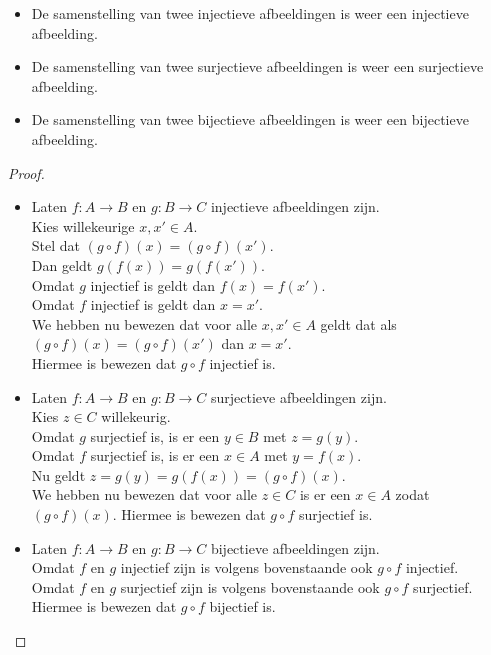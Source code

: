 \begin{theorem}\mbox{}
\begin{itemize}
    \item De samenstelling van twee injectieve afbeeldingen is weer een injectieve afbeelding.
    \item De samenstelling van twee surjectieve afbeeldingen is weer een surjectieve afbeelding.
    \item De samenstelling van twee bijectieve afbeeldingen is weer een bijectieve afbeelding.
\end{itemize}\label{st:compositie}
\end{theorem}
\begin{proof}\mbox{}\\
\indent\begin{minipage}{0.9\textwidth}
\begin{itemize}
    \item Laten $f:A\rightarrow B$ en $g:B\rightarrow C$ injectieve afbeeldingen zijn.\\[1.5pt] 
    Kies willekeurige $x, x'\in A$.\\[1.5pt]
    Stel dat $(g\circ f)(x)=(g\circ f)(x')$.\\[1.5pt]
    Dan geldt $g(f(x)) = g(f(x'))$.\\[1.5pt]
    Omdat $g$ injectief is geldt dan $f(x)=f(x')$.\\[1.5pt]
    Omdat $f$ injectief is geldt dan $x=x'$.\\[1.5pt]
    We hebben nu bewezen dat voor alle $x,x'\in A$ geldt dat als $(g\circ f)(x)=(g\circ f)(x')$ dan $x=x'$.\\[1.5pt]
    Hiermee is bewezen dat $g\circ f$ injectief is.
    \item Laten $f:A\rightarrow B$ en $g:B\rightarrow C$ surjectieve afbeeldingen zijn.\\[1.5pt]
    Kies $z\in C$ willekeurig.\\[1.5pt]
    Omdat $g$ surjectief is, is er een $y\in B$ met $z=g(y)$.\\[1.5pt]
    Omdat $f$ surjectief is, is er een $x\in A$ met $y = f(x)$.\\[1.5pt]
    Nu geldt $z=g(y)=g(f(x))=(g\circ f)(x)$.\\[1.5pt]
    We hebben nu bewezen dat voor alle $z\in C$ is er een $x\in A$ zodat $(g\circ f)(x)$.
    Hiermee is bewezen dat $g\circ f$ surjectief is.
    \item Laten $f:A\rightarrow B$ en $g:B\rightarrow C$ bijectieve afbeeldingen zijn.\\[1.5pt]
    Omdat $f$ en $g$ injectief zijn is volgens bovenstaande ook $g\circ f$ injectief.\\[1.5pt]
    Omdat $f$ en $g$ surjectief zijn is volgens bovenstaande ook $g\circ f$ surjectief.\\[1.5pt]
    Hiermee is bewezen dat $g\circ f$ bijectief is.
\end{itemize}
\end{minipage}
\end{proof}

